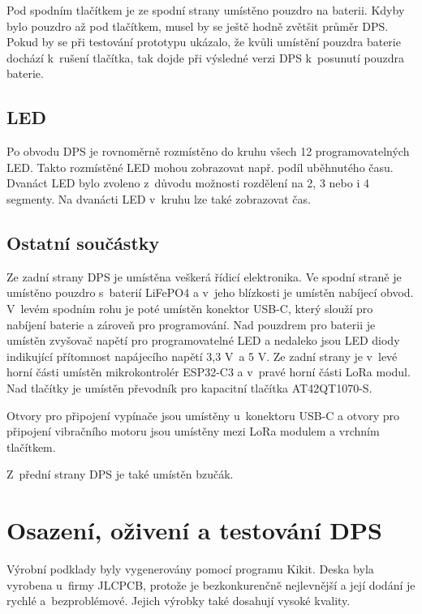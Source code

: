 Pod spodním tlačítkem je ze spodní strany umístěno pouzdro na baterii. Kdyby bylo pouzdro až pod tlačítkem, musel by se ještě hodně zvětšit průměr DPS. Pokud by se při testování 
prototypu ukázalo, že kvůli umístění pouzdra baterie dochází k~rušení tlačítka, tak dojde při výsledné verzi DPS k~posunutí pouzdra baterie. 

\section{LED}
Po obvodu DPS je rovnoměrně rozmístěno do kruhu všech 12 programovatelných LED. Takto rozmístěné LED mohou zobrazovat např. podíl uběhnutého času. Dvanáct LED bylo zvoleno 
z~důvodu možnosti rozdělení na 2, 3 nebo i 4 segmenty. Na dvanácti LED v~kruhu lze také zobrazovat čas.

\section{Ostatní součástky}
Ze zadní strany DPS je umístěna veškerá řídicí elektronika. Ve spodní straně je umístěno pouzdro s~baterií LiFePO4 a v~jeho blízkosti je umístěn nabíjecí obvod. V~levém 
spodním rohu je poté umístěn konektor USB-C, který slouží pro nabíjení baterie a zároveň pro programování. Nad pouzdrem pro baterii je umístěn zvyšovač napětí pro programovatelné 
LED a nedaleko jsou LED diody indikující přítomnost napájecího napětí 3,3 V~a 5 V. Ze zadní strany je v~levé horní části umístěn mikrokontrolér ESP32-C3 a v~pravé horní části 
LoRa modul. Nad tlačítky je umístěn převodník pro kapacitní tlačítka AT42QT1070-S.

Otvory pro připojení vypínače jsou umístěny u~konektoru USB-C a otvory pro připojení vibračního motoru jsou umístěny mezi LoRa modulem a vrchním tlačítkem. 

Z~přední strany DPS je také umístěn bzučák. 

\chapter{Osazení, oživení a testování DPS}
Výrobní podklady byly vygenerovány pomocí programu Kikit. Deska byla vyrobena u~firmy JLCPCB, protože je bezkonkurenčně nejlevnější a její dodání je rychlé a~bezproblémové. 
Jejich výrobky také dosahují vysoké kvality. 

